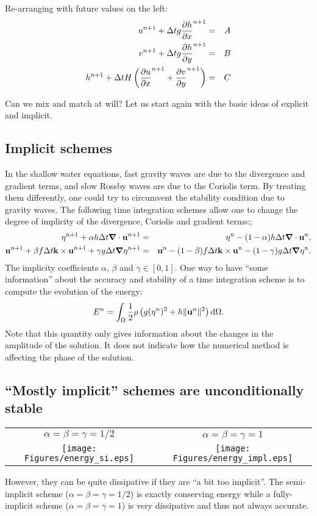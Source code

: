 Re-arranging with future values on the left:
\begin{eqnarray*}
	u^{n+1}+\Delta t g \frac{\partial h}{\partial x}^{n+1} & = & A \\
	v^{n+1}+\Delta t g \frac{\partial h}{\partial y}^{n+1} & = & B \\
	h^{n+1}+\Delta t H \left( \frac{\partial u}{\partial x}^{n+1}+\frac{\partial v}{\partial y}^{n+1} \right) & = & C
\end{eqnarray*}

Can we mix and match at will? Let us start again with the basic ideas of explicit and implicit.


\subsection{Implicit schemes}

In the shallow water equations, fast gravity waves are due to the divergence and gradient terms, and slow Rossby waves are due to the Coriolis term. By treating them differently, one could try to circumvent the stability condition due to gravity waves. The following time integration schemes allow one to change the degree of implicity of the divergence, Coriolis and gradient terms:;
\begin{eqnarray*}
	\eta^{n+1} + \alpha h \Delta t \mbox{\boldmath $\nabla$} \cdot \mathbf{u}^{n+1} &=& \eta^n - (1-\alpha) h \Delta t \mbox{\boldmath $\nabla$} \cdot \mathbf{u}^n,
	\\
	\mathbf{u}^{n+1} + \beta f \Delta t \mathbf{k} \times \mathbf{u}^{n+1} + \gamma g \Delta t \mbox{\boldmath $\nabla$} \eta^{n+1} &=& \mathbf{u}^n - (1-\beta) f \Delta t \mathbf{k} \times \mathbf{u}^n - (1-\gamma) g \Delta t \mbox{\boldmath $\nabla$} \eta^n.
\end{eqnarray*}
The implicity coefficients $\alpha$, $\beta$ and $\gamma \in [0,1]$. One way to have ``some information'' about the accuracy and stability of a time integration scheme is to compute the evolution of the energy:
\[
E^n = \int_{\Omega} \frac{1}{2} \rho \left( g (\eta^n)^2 + h \|\mathbf{u}^n\|^2 \right) \mathop{\mathrm{{}d}}\mathopen{} \Omega.
\]
Note that this quantity only gives information about the changes in the amplitude of the solution. It does not indicate how the numerical method is affecting the phase of the solution.


\subsection{``Mostly implicit'' schemes are unconditionally stable}

\begin{center}
	\begin{tabular}{cc}
		$\alpha = \beta = \gamma = 1/2$  & $\alpha = \beta = \gamma = 1$ \\
		\texttt{[image: Figures/energy\_si.eps]}
		&
		\texttt{[image: Figures/energy\_impl.eps]}
	\end{tabular}
\end{center}
However, they can be quite dissipative if they are ``a bit too implicit''. The semi-implicit scheme ($\alpha = \beta = \gamma = 1/2$) is exactly conserving energy while a fully-implicit scheme ($\alpha = \beta = \gamma = 1$) is very dissipative and thus not always accurate.


